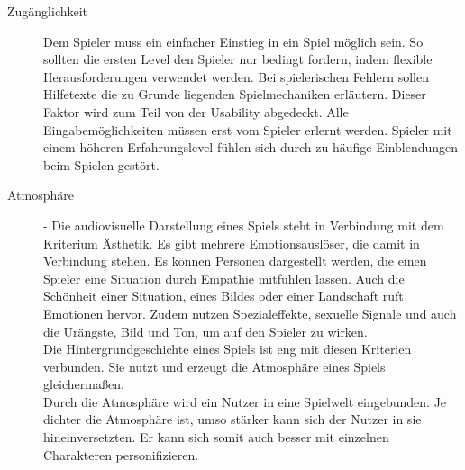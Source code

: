 \begin{description}
\item[Zugänglichkeit]
Dem Spieler muss ein einfacher Einstieg in ein Spiel möglich sein. So sollten die ersten Level den Spieler nur bedingt fordern, indem flexible Herausforderungen verwendet werden. Bei spielerischen Fehlern sollen Hilfetexte die zu Grunde liegenden Spielmechaniken erläutern. Dieser Faktor wird zum Teil von der Usability abgedeckt. Alle Eingabemöglichkeiten müssen erst vom Spieler erlernt werden. Spieler mit einem höheren Erfahrungslevel fühlen sich durch zu häufige Einblendungen beim Spielen gestört.






\item[Atmosphäre] - Die audiovisuelle Darstellung eines Spiels steht in Verbindung mit dem Kriterium Ästhetik. Es gibt mehrere Emotionsauslöser, die damit in Verbindung stehen. Es können Personen dargestellt werden, die einen Spieler eine Situation durch Empathie mitfühlen lassen. Auch die Schönheit einer Situation, eines Bildes oder einer Landschaft ruft Emotionen hervor. Zudem nutzen Spezialeffekte, sexuelle Signale und auch die Urängste, Bild und Ton, um auf den Spieler zu wirken.  \\
Die Hintergrundgeschichte eines Spiels ist eng mit diesen Kriterien verbunden. Sie nutzt und erzeugt die Atmosphäre eines Spiels gleichermaßen. \\
Durch die Atmosphäre wird ein Nutzer in eine Spielwelt eingebunden. Je dichter die Atmosphäre ist, umso stärker kann sich der Nutzer in sie hineinversetzten. Er kann sich somit auch besser mit einzelnen Charakteren personifizieren. 





\end{description}
